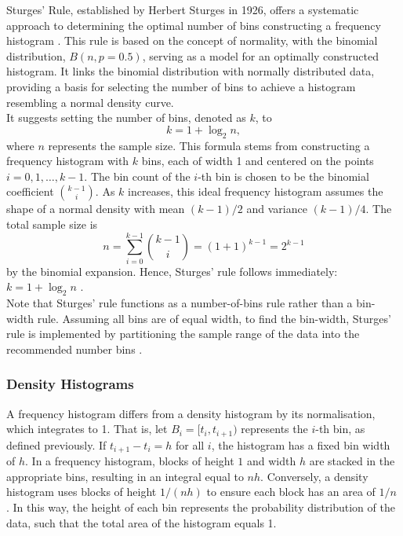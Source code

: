 \documentclass{article}\usepackage[]{graphicx}\usepackage[]{xcolor}
\numberwithin{equation}{section}
\begin{document}
\noindent Sturges' Rule, established by Herbert Sturges in 1926, offers a systematic approach to determining the optimal number of bins constructing a frequency histogram \cite{scott2015multivariate}. This rule is based on the concept of normality, with the binomial distribution, $B(n,p = 0.5)$, serving as a model for an optimally constructed histogram. It links the binomial distribution with normally distributed data, providing a basis for selecting the number of bins to achieve a histogram resembling a normal density curve.\\

\noindent It suggests setting the number of bins, denoted as $k$, to \[ k = 1 + \log_{2} n, \] where $n$ represents the sample size. This formula stems from constructing a frequency histogram with $k$ bins, each of width 1 and centered on the points $i = 0,1,\dots, k - 1$. The bin count of the $i$-th bin is chosen to be the binomial coefficient $\binom{k-1}{i}$. As $k$ increases, this ideal frequency histogram assumes the shape of a normal density with mean $(k - 1)/2$ and variance $(k - 1)/4$. The total sample size is
\[ n = \sum_{i=0}^{k-1} \binom{k-1}{i} = (1+1)^{k-1} = 2^{k-1} \]
by the binomial expansion. Hence, Sturges’ rule follows immediately: $k = 1 + \log_2 n$ \cite{scott2015multivariate}.\\

\noindent Note that Sturges’ rule functions as a number-of-bins rule rather than a bin-width rule. Assuming all bins are of equal width, to find the bin-width, Sturges’ rule is implemented by partitioning the sample range of the data into the recommended number bins \cite{scott2015multivariate}.

\subsubsection{Density Histograms}

\noindent A frequency histogram differs from a density histogram by its normalisation, which integrates to 1. That is, let $B_i = [t_i,t_{i+1})$ represents the $i$-th bin, as defined previously. If $t_{i+1} − t_i = h$ for all $i$, the histogram has a fixed bin width of $h$. In a frequency histogram, blocks of height $1$ and width $h$ are stacked in the appropriate bins, resulting in an integral equal to $nh$. Conversely, a density histogram uses blocks of height $1/(nh)$ to ensure each block has an area of $1/n$ \cite{scott2015multivariate}. In this way, the height of each bin represents the probability distribution of the data, such that the total area of the histogram equals 1.\\
\end{document}

